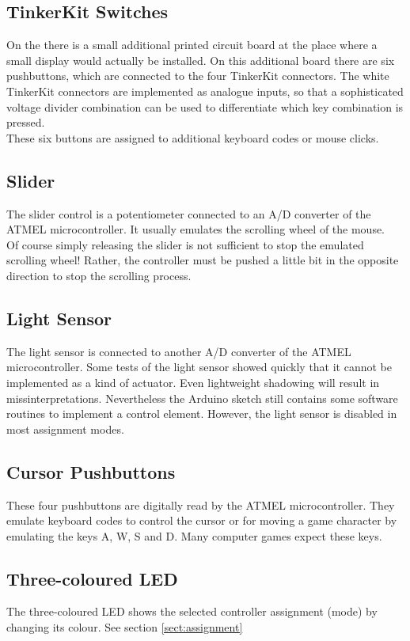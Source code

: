 \subsection*{TinkerKit Switches}
On the {\Bezeichnung} there is a small additional printed circuit board
at the place where a small display would actually be installed. On this
additional board there are six pushbuttons, which are connected to the
four TinkerKit connectors. The white TinkerKit connectors are
implemented as analogue inputs, so that a sophisticated voltage divider
combination can be used to differentiate which key combination is
pressed.\\
These six buttons are assigned to additional keyboard codes or mouse
clicks.

\subsection*{Slider}
The slider control is a potentiometer connected to an A/D converter of 
the ATMEL microcontroller. It usually emulates the scrolling wheel of
the mouse.\\
Of course simply releasing the slider is not sufficient to stop the
emulated scrolling wheel! Rather, the controller must be pushed a little
bit in the opposite direction to stop the scrolling process.

\subsection*{Light Sensor}
The light sensor is connected to another A/D converter of the ATMEL
microcontroller. Some tests of the light sensor showed quickly that it
cannot be implemented as a kind of actuator. Even lightweight shadowing
will result in missinterpretations. Nevertheless the Arduino sketch
still contains some software routines to implement a control element.
However, the light sensor is disabled in most assignment modes.

\subsection*{Cursor Pushbuttons}
These four pushbuttons are digitally read by the ATMEL microcontroller.
They emulate keyboard codes to control the cursor or for moving a game
character by emulating the keys A, W, S and D. Many computer
games expect these keys.

\subsection*{Three-coloured LED}
The three-coloured LED shows the selected controller assignment (mode)
by changing its colour. See section \ref{sect:assignment}


